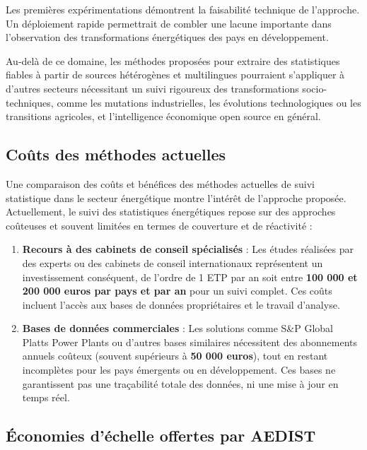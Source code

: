\documentclass[a4paper,11pt]{report}
\providecommand{\tightlist}{\setlength{\itemsep}{0pt}\setlength{\parskip}{0pt}}
\begin{document}
Les premières expérimentations démontrent la faisabilité technique de l'approche. Un déploiement rapide permettrait de combler une lacune importante dans l'observation des transformations énergétiques des pays en développement.

Au-delà de ce domaine, les méthodes proposées pour extraire des statistiques fiables à partir de sources hétérogènes et multilingues pourraient s'appliquer à d'autres secteurs nécessitant un suivi rigoureux des transformations socio-techniques, comme les mutations industrielles, les évolutions technologiques ou les transitions agricoles, et l'intelligence économique open source en général.

\subsection{Coûts des méthodes actuelles}\label{couxfbts-des-muxe9thodes-actuelles}

Une comparaison des coûts et bénéfices des méthodes actuelles de suivi statistique dans le secteur énergétique montre l'intérêt de l'approche proposée. Actuellement, le suivi des statistiques énergétiques repose sur des approches coûteuses et souvent limitées en termes de couverture et de réactivité :

\begin{enumerate}
\def\labelenumi{\arabic{enumi}.}
\tightlist
\item
  \textbf{Recours à des cabinets de conseil spécialisés} : Les études réalisées par des experts ou des cabinets de conseil internationaux représentent un investissement conséquent, de l'ordre de 1 ETP par an soit entre \textbf{100 000 et 200 000 euros par pays et par an} pour un suivi complet. Ces coûts incluent l'accès aux bases de données propriétaires et le travail d'analyse.
\item
  \textbf{Bases de données commerciales} : Les solutions comme S\&P Global Platts Power Plants ou d'autres bases similaires nécessitent des abonnements annuels coûteux (souvent supérieurs à \textbf{50 000 euros}), tout en restant incomplètes pour les pays émergents ou en développement. Ces bases ne garantissent pas une traçabilité totale des données, ni une mise à jour en temps réel.
\end{enumerate}

\subsection{Économies d'échelle offertes par AEDIST}\label{uxe9conomies-duxe9chelle-offertes-par-aedist}
\end{document}
